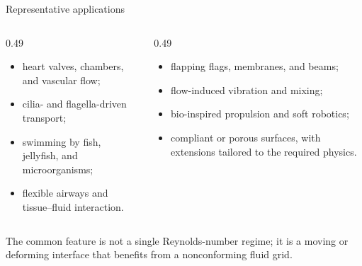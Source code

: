 \documentclass[aspectratio=169,11pt]{beamer}
\begin{document}
\begin{frame}{Representative applications}
\begin{columns}[T,onlytextwidth]
\begin{column}{0.49\textwidth}
\begin{itemize}\itemsep5pt
  \item heart valves, chambers, and vascular flow;
  \item cilia- and flagella-driven transport;
  \item swimming by fish, jellyfish, and microorganisms;
  \item flexible airways and tissue--fluid interaction.
\end{itemize}
\end{column}
\begin{column}{0.49\textwidth}
\begin{itemize}\itemsep5pt
  \item flapping flags, membranes, and beams;
  \item flow-induced vibration and mixing;
  \item bio-inspired propulsion and soft robotics;
  \item compliant or porous surfaces, with extensions tailored to the required physics.
\end{itemize}
\end{column}
\end{columns}
\begin{punchbox}
\small The common feature is not a single Reynolds-number regime; it is a moving or deforming interface that benefits from a nonconforming fluid grid.
\end{punchbox}
\end{frame}
\end{document}
